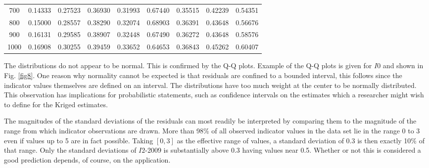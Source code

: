 \documentclass[Journal]{ascelike}
\begin{document}
\begin{table}[htbp]
\begin{center}
\begin{tabular}{l|l|l|l|l|l|l|l|l}
\multicolumn{1}{c|}{700} & \multicolumn{1}{c|}{0.14333} & \multicolumn{1}{c|}{0.27523} & \multicolumn{1}{c|}{0.36930} & \multicolumn{1}{c|}{0.31993} & \multicolumn{1}{c|}{0.67440} & \multicolumn{1}{c|}{0.35515} & \multicolumn{1}{c|}{0.42239} & \multicolumn{1}{c}{0.54351} \\ 
\multicolumn{1}{c|}{800} & \multicolumn{1}{c|}{0.15000} & \multicolumn{1}{c|}{0.28557} & \multicolumn{1}{c|}{0.38290} & \multicolumn{1}{c|}{0.32074} & \multicolumn{1}{c|}{0.68903} & \multicolumn{1}{c|}{0.36391} & \multicolumn{1}{c|}{0.43648} & \multicolumn{1}{c}{0.56676} \\ 
\multicolumn{1}{c|}{900} & \multicolumn{1}{c|}{0.16131} & \multicolumn{1}{c|}{0.29585} & \multicolumn{1}{c|}{0.38907} & \multicolumn{1}{c|}{0.32448} & \multicolumn{1}{c|}{0.67490} & \multicolumn{1}{c|}{0.36272} & \multicolumn{1}{c|}{0.43648} & \multicolumn{1}{c}{0.58576} \\ 
\multicolumn{1}{c|}{1000} & \multicolumn{1}{c|}{0.16908} & \multicolumn{1}{c|}{0.30255} & \multicolumn{1}{c|}{0.39459} & \multicolumn{1}{c|}{0.33652} & \multicolumn{1}{c|}{0.64653} & \multicolumn{1}{c|}{0.36843} & \multicolumn{1}{c|}{0.45262} & \multicolumn{1}{c}{0.60407} \\ 
\hline
\end{tabular}
\label{table6}
\end{center}
\end{table}
%
The distributions do not appear to be normal. This is confirmed by the Q-Q plots. Example of the Q-Q plots is given for $I0$ and shown in Fig. \ref{fig8}. One reason why normality cannot be expected is that residuals are confined to a bounded interval, this follows since the indicator values themselves are defined on an interval. The distributions have too much weight at the center to be normally distributed. This observation has implications for probabilistic statements, such as confidence intervals on the estimates which a researcher might wish to define for the Kriged estimates.

The magnitudes of the standard deviations of the residuals can most readily be
interpreted by comparing them to the magnitude of the range from which indicator
observations are drawn. More than 98\% of all observed indicator values in the data
set lie in the range 0 to 3 even if values up to 5 are in fact possible. Taking $[0, 3]$ as
the effective range of values, a standard deviation of 0.3 is then exactly 10\% of that
range. Only the standard deviations of $I2$-2009 is substantially above 0.3 having values
near 0.5. Whether or not this is considered a good prediction depends, of course, on
the application.
\end{document}
